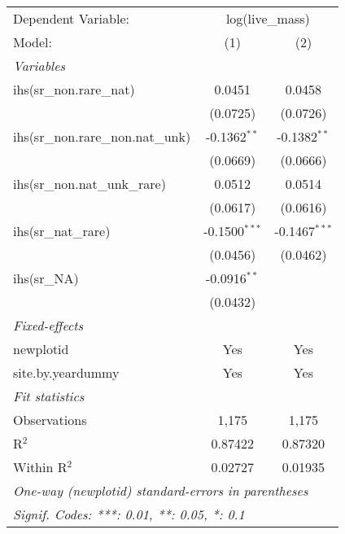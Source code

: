 \begin{tabular}{lcc}
\tabularnewline\midrule\midrule
Dependent Variable:&\multicolumn{2}{c}{log(live\_mass)}\\
Model:&(1) & (2)\\
\midrule \emph{Variables}&   &  \\
ihs(sr\_non.rare\_nat)&0.0451 & 0.0458\\
  &(0.0725) & (0.0726)\\
ihs(sr\_non.rare\_non.nat\_unk)&-0.1362$^{**}$ & -0.1382$^{**}$\\
  &(0.0669) & (0.0666)\\
ihs(sr\_non.nat\_unk\_rare)&0.0512 & 0.0514\\
  &(0.0617) & (0.0616)\\
ihs(sr\_nat\_rare)&-0.1500$^{***}$ & -0.1467$^{***}$\\
  &(0.0456) & (0.0462)\\
ihs(sr\_NA)&-0.0916$^{**}$ &   \\
  &(0.0432) &   \\
\midrule \emph{Fixed-effects}&   &  \\
newplotid & Yes & Yes\\
site.by.yeardummy & Yes & Yes\\
\midrule \emph{Fit statistics}&  & \\
Observations & 1,175&1,175\\
R$^2$ & 0.87422&0.87320\\
Within R$^2$ & 0.02727&0.01935\\
\midrule\midrule\multicolumn{3}{l}{\emph{One-way (newplotid) standard-errors in parentheses}}\\
\multicolumn{3}{l}{\emph{Signif. Codes: ***: 0.01, **: 0.05, *: 0.1}}\\
\end{tabular}


